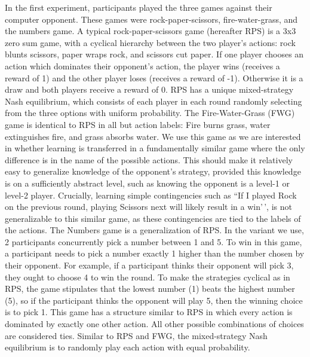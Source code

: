\documentclass[
  english,
  man,floatsintext]{apa6}
\begin{document}
In the first experiment, participants played the three games against their computer opponent. These games were rock-paper-scissors, fire-water-grass, and the numbers game. A typical rock-paper-scissors game (hereafter RPS) is a 3x3 zero sum game, with a cyclical hierarchy between the two player's actions: rock blunts scissors, paper wraps rock, and scissors cut paper. If one player chooses an action which dominates their opponent's action, the player wins (receives a reward of 1) and the other player loses (receives a reward of -1). Otherwise it is a draw and both players receive a reward of 0. RPS has a unique mixed-strategy Nash equilibrium, which consists of each player in each round randomly selecting from the three options with uniform probability. The Fire-Water-Grass (FWG) game is identical to RPS in all but action labels: Fire burns grass, water extinguishes fire, and grass absorbs water. We use this game as we are interested in whether learning is transferred in a fundamentally similar game where the only difference is in the name of the possible actions. This should make it relatively easy to generalize knowledge of the opponent's strategy, provided this knowledge is on a sufficiently abstract level, such as knowing the opponent is a level-1 or level-2 player. Crucially, learning simple contingencies such as ``If I played Rock on the previous round, playing Scissors next will likely result in a win'\,', is not generalizable to this similar game, as these contingencies are tied to the labels of the actions. The Numbers game is a generalization of RPS. In the variant we use, 2 participants concurrently pick a number between 1 and 5. To win in this game, a participant needs to pick a number exactly 1 higher than the number chosen by their opponent. For example, if a participant thinks their opponent will pick 3, they ought to choose 4 to win the round. To make the strategies cyclical as in RPS, the game stipulates that the lowest number (1) beats the highest number (5), so if the participant thinks the opponent will play 5, then the winning choice is to pick 1. This game has a structure similar to RPS in which every action is dominated by exactly one other action. All other possible combinations of choices are considered ties. Similar to RPS and FWG, the mixed-strategy Nash equilibrium is to randomly play each action with equal probability.
\end{document}
